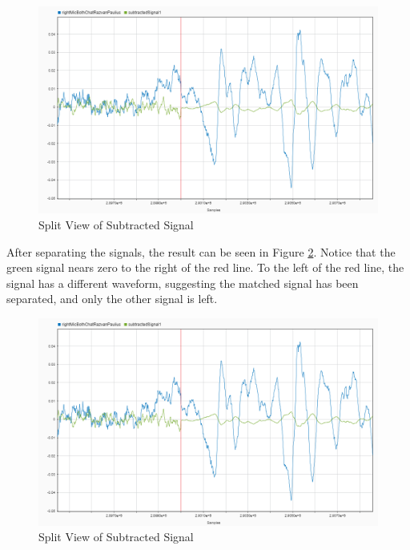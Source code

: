 \begin{figure}[htp]
	\centering
	\includegraphics[width=.9\textwidth]{Illustrations/rightAndSubtractedSplitView.png}
	\caption{Split View of Subtracted Signal}
	\label{fig:SplitSeparated}
\end{figure}
\newpage
\begin{minipage}{\textwidth}
After separating the signals, the result can be seen in Figure \ref{fig:SplitSeparated}.
Notice that the green signal nears zero to the right of the red line. To the left of the
red line, the signal has a different waveform, suggesting the matched signal has been
separated, and only the other signal is left.
\end{minipage}
\begin{minipage}{\textwidth}
\begin{figure}[htp]
	\centering
	\includegraphics[width=\textwidth]{Illustrations/rightAndSubtractedSplitView.png}
	\caption{Split View of Subtracted Signal}
	\label{fig:SplitSeparated}
\end{figure}
\end{minipage}



